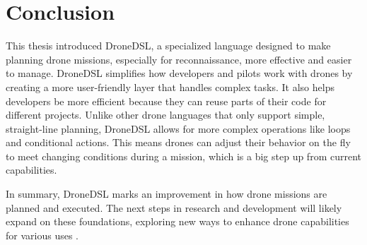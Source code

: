 \chapter{Conclusion}
\label{sec:conclude}

This thesis introduced DroneDSL, a specialized language designed to make planning drone missions, especially for reconnaissance, more effective and easier to manage. DroneDSL simplifies how developers and pilots work with drones by creating a more user-friendly layer that handles complex tasks. It also helps developers be more efficient because they can reuse parts of their code for different projects. Unlike other drone languages that only support simple, straight-line planning, DroneDSL allows for more complex operations like loops and conditional actions. This means drones can adjust their behavior on the fly to meet changing conditions during a mission, which is a big step up from current capabilities.


In summary, DroneDSL marks an improvement in how drone missions are planned and executed. The next steps in research and development will likely expand on these foundations, exploring new ways to enhance drone capabilities for various uses .